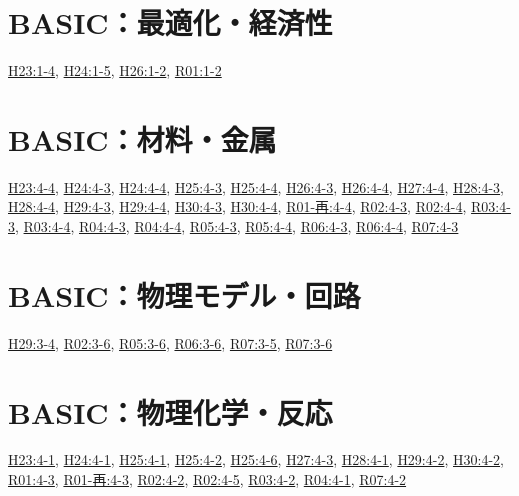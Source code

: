 \section{BASIC：最適化・経済性}
\hyperref[q:h23-reg-basic-1-4]{H23:1-4}, \hyperref[q:h24-reg-basic-1-5]{H24:1-5}, \hyperref[q:h26-reg-basic-1-2]{H26:1-2}, \hyperref[q:r01-reg-basic-1-2]{R01:1-2}
\section{BASIC：材料・金属}
\hyperref[q:h23-reg-basic-4-4]{H23:4-4}, \hyperref[q:h24-reg-basic-4-3]{H24:4-3}, \hyperref[q:h24-reg-basic-4-4]{H24:4-4}, \hyperref[q:h25-reg-basic-4-3]{H25:4-3}, \hyperref[q:h25-reg-basic-4-4]{H25:4-4}, \hyperref[q:h26-reg-basic-4-3]{H26:4-3}, \hyperref[q:h26-reg-basic-4-4]{H26:4-4}, \hyperref[q:h27-reg-basic-4-4]{H27:4-4}, \hyperref[q:h28-reg-basic-4-3]{H28:4-3}, \hyperref[q:h28-reg-basic-4-4]{H28:4-4}, \hyperref[q:h29-reg-basic-4-3]{H29:4-3}, \hyperref[q:h29-reg-basic-4-4]{H29:4-4}, \hyperref[q:h30-reg-basic-4-3]{H30:4-3}, \hyperref[q:h30-reg-basic-4-4]{H30:4-4}, \hyperref[q:r01-ret-basic-4-4]{R01-再:4-4}, \hyperref[q:r02-reg-basic-4-3]{R02:4-3}, \hyperref[q:r02-reg-basic-4-4]{R02:4-4}, \hyperref[q:r03-reg-basic-4-3]{R03:4-3}, \hyperref[q:r03-reg-basic-4-4]{R03:4-4}, \hyperref[q:r04-reg-basic-4-3]{R04:4-3}, \hyperref[q:r04-reg-basic-4-4]{R04:4-4}, \hyperref[q:r05-reg-basic-4-3]{R05:4-3}, \hyperref[q:r05-reg-basic-4-4]{R05:4-4}, \hyperref[q:r06-reg-basic-4-3]{R06:4-3}, \hyperref[q:r06-reg-basic-4-4]{R06:4-4}, \hyperref[q:r07-reg-basic-4-3]{R07:4-3}
\section{BASIC：物理モデル・回路}
\hyperref[q:h29-reg-basic-3-4]{H29:3-4}, \hyperref[q:r02-reg-basic-3-6]{R02:3-6}, \hyperref[q:r05-reg-basic-3-6]{R05:3-6}, \hyperref[q:r06-reg-basic-3-6]{R06:3-6}, \hyperref[q:r07-reg-basic-3-5]{R07:3-5}, \hyperref[q:r07-reg-basic-3-6]{R07:3-6}
\section{BASIC：物理化学・反応}
\hyperref[q:h23-reg-basic-4-1]{H23:4-1}, \hyperref[q:h24-reg-basic-4-1]{H24:4-1}, \hyperref[q:h25-reg-basic-4-1]{H25:4-1}, \hyperref[q:h25-reg-basic-4-2]{H25:4-2}, \hyperref[q:h25-reg-basic-4-6]{H25:4-6}, \hyperref[q:h27-reg-basic-4-3]{H27:4-3}, \hyperref[q:h28-reg-basic-4-1]{H28:4-1}, \hyperref[q:h29-reg-basic-4-2]{H29:4-2}, \hyperref[q:h30-reg-basic-4-2]{H30:4-2}, \hyperref[q:r01-reg-basic-4-3]{R01:4-3}, \hyperref[q:r01-ret-basic-4-3]{R01-再:4-3}, \hyperref[q:r02-reg-basic-4-2]{R02:4-2}, \hyperref[q:r02-reg-basic-4-5]{R02:4-5}, \hyperref[q:r03-reg-basic-4-2]{R03:4-2}, \hyperref[q:r04-reg-basic-4-1]{R04:4-1}, \hyperref[q:r07-reg-basic-4-2]{R07:4-2}

